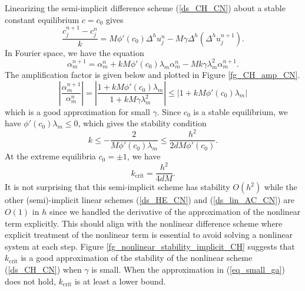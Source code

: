 \documentclass[12pt, reqno]{report}
\theoremstyle{definition}
\theoremstyle{remark}
\begin{document}
Linearizing the semi-implicit difference scheme (\ref{ds_CH_CN}) about a stable constant equilibrium $c=c_{0}$ gives
\begin{equation} \label{ds_lin_CH_CN}
    \frac{c_{j}^{n+1}-c_{j}^{n}}{k}=M\phi'(c_{0})\Delta^{h}u_{j}^{n}-M\gamma \Delta^{h}(\Delta^{h}u_{j}^{n+1}). \tag{lin-S6}
\end{equation}
In Fourier space, we have the equation 
\begin{equation}
    \alpha_{m}^{n+1}=\alpha_{m}^{n}+kM\phi'(c_{0})\lambda_{m}\alpha_{m}^{n}-Mk \gamma \lambda_{m}^{2}\alpha_{m}^{n+1}.
\end{equation}
The amplification factor is given below and plotted in Figure \ref{fg_CH_amp_CN}. 
\begin{equation}  \label{eq_small_ga}
    \left| \frac{\alpha_{m}^{n+1}}{\alpha_{m}^{n}}\right|=\left| \frac{1+kM\phi'(c_{0})\lambda_{m}}{1+kM\gamma \lambda_{m}^{2}}\right|\le|1+kM\phi'(c_{0})\lambda_{m}|
\end{equation}
which is a good approximation for small $\gamma$. 
Since $c_{0}$ is a stable equilibrium, we have $\phi'(c_{0})\lambda_{m}\le0$, which gives the stability condition 
\begin{equation} 
    k\le - \frac{2}{M\phi'(c_{0})\lambda_{m}}\le \frac{h^{2}}{2dM\phi'(c_{0})}.
\end{equation}
At the extreme equilibria $c_{0}=\pm1$, we have 
\begin{equation} 
    k_\text{crit}= \frac{h^{2}}{4dM}.
\end{equation}
It is not surprising that this semi-implicit scheme has stability $O(h^{2})$ while the other (semi)-implicit linear schemes (\ref{ds_HE_CN}) and (\ref{ds_lin_AC_CN}) are $O(1)$ in $h$ since we handled the derivative of the approximation of the nonlinear term explicitly.
This should align with the nonlinear difference scheme where explicit treatment of the nonlinear term is essential to avoid solving a nonlinear system at each step. 
Figure \ref{fg_nonlinear_stability_implicit_CH} suggests that $k_\text{crit}$ is a good approximation of the stability of the nonlinear scheme (\ref{ds_CH_CN}) when $\gamma$ is small.
When the approximation in (\ref{eq_small_ga}) does not hold, $k_\text{crit}$ is at least a lower bound.
\end{document}
